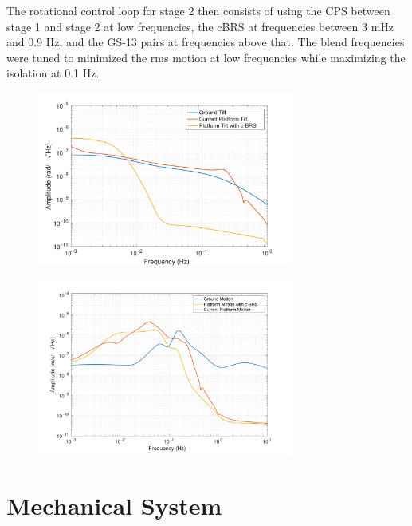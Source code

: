 \documentclass [12pt, proquest]{uwthesis}[2019]
\begin{document}
The rotational control loop for stage 2 then consists of using the CPS between stage 1 and stage 2 at low frequencies, the cBRS at frequencies between 3 mHz and 0.9 Hz, and the GS-13 pairs at frequencies above that. The blend frequencies were tuned to minimized the rms motion at low frequencies while maximizing the isolation at 0.1 Hz. 

\begin{figure}%
\begin{center}
\includegraphics[width=0.75\textwidth]{cBRSRotation.pdf}
\caption{}
\label{cBRSR}
\end{center}
\end{figure}

\begin{figure}%
\begin{center}
\includegraphics[width=0.75\textwidth]{cBRSTranslation.pdf}
\caption{}
\label{cBRST}
\end{center}
\end{figure}

\section{Mechanical System}
\end{document}

